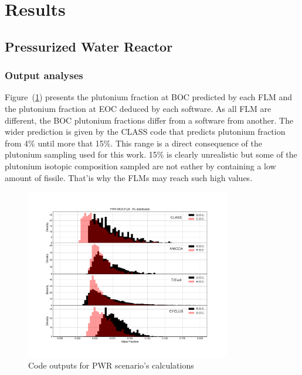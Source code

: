
\section{Results}
 
\subsection{Pressurized Water Reactor}

\subsubsection{Output analyses}
Figure~(\ref{fig:PWR_MOX_FLM_Pu.pdf}) presents the plutonium fraction at BOC predicted by each FLM and the plutonium fraction at EOC deduced by each software. As all FLM are different, the BOC plutonium fractions differ from a software from another. The wider prediction is given by the CLASS code that predicts plutonium fraction from 4\% until more that 15\%. This range is a direct consequence of the plutonium sampling used for this work. 15\% is clearly unrealistic but some of the plutonium isotopic composition sampled are not eather by containing a low amount of fissile. That'is why the FLMs may reach such high values.   

\begin{figure}[h]
	\begin{center}
		\includegraphics[width = 0.8\textwidth]{../../Feature_1/RAW_DATA/FIG/PWR_MOX_FLM_Pu.pdf}
		\caption{Code outputs for PWR scenario's calculations}
		\label{fig:PWR_MOX_FLM_Pu.pdf}
	\end{center}
\end{figure}

